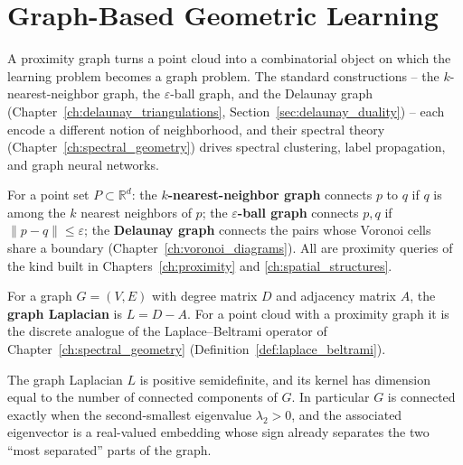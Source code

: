 
\section{Graph-Based Geometric Learning}
\label{sec:data_ml_graphs}

A proximity graph turns a point cloud into a combinatorial object on which
the learning problem becomes a graph problem. The standard constructions --
the $k$-nearest-neighbor graph, the $\varepsilon$-ball graph, and the
Delaunay graph (Chapter~\ref{ch:delaunay_triangulations},
Section~\ref{sec:delaunay_duality}) -- each encode a different notion of
neighborhood, and their spectral theory (Chapter~\ref{ch:spectral_geometry})
drives spectral clustering, label propagation, and graph neural networks.

\begin{definition}\label{def:data_ml_proximity_graph}
  For a point set $P \subset \mathbb{R}^d$: the \textbf{$k$-nearest-neighbor
  graph} connects $p$ to $q$ if $q$ is among
  the $k$ nearest neighbors of $p$; the \textbf{$\varepsilon$-ball graph}
  connects $p, q$ if $\|p - q\| \leq \varepsilon$; the
  \textbf{Delaunay graph} connects the pairs whose Voronoi cells share a
  boundary (Chapter~\ref{ch:voronoi_diagrams}). All are proximity queries of
  the kind built in Chapters~\ref{ch:proximity} and
  \ref{ch:spatial_structures}.
\end{definition}

\begin{definition}\label{def:data_ml_laplacian}
  For a graph $G = (V, E)$ with degree matrix $D$ and adjacency matrix $A$,
  the \textbf{graph Laplacian} is $L = D - A$. For a point cloud with a
  proximity graph it is the discrete analogue of the Laplace--Beltrami
  operator of Chapter~\ref{ch:spectral_geometry}
  (Definition~\ref{def:laplace_beltrami}).
\end{definition}

\begin{theorem}\label{thm:data_ml_laplacian_components}
  The graph Laplacian $L$ is positive semidefinite, and its kernel has
  dimension equal to the number of connected components of $G$. In
  particular $G$ is connected exactly when the second-smallest eigenvalue
  $\lambda_2 > 0$, and the associated eigenvector is a real-valued embedding
  whose sign already separates the two ``most separated'' parts of the graph.
\end{theorem}

